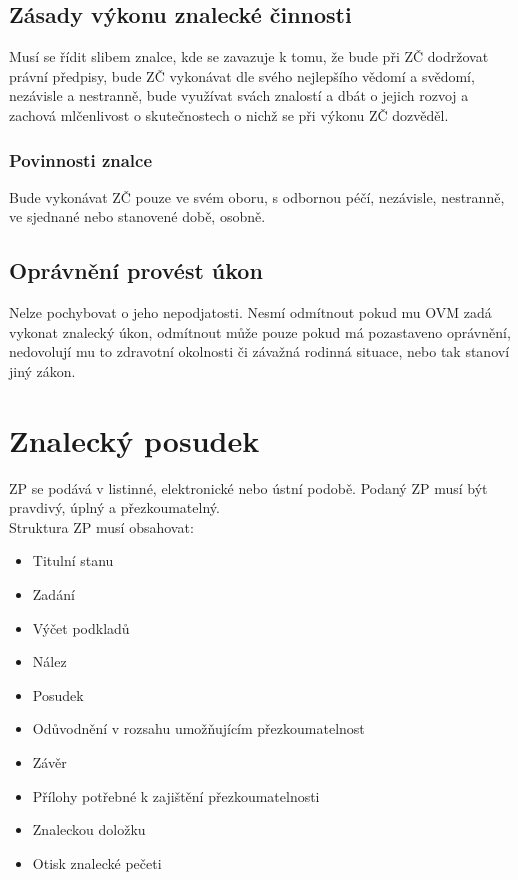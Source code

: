\subsection{Zásady výkonu znalecké činnosti}
Musí se řídit slibem znalce, kde se zavazuje k tomu, že bude při ZČ dodržovat právní předpisy, bude ZČ vykonávat dle svého nejlepšího vědomí a svědomí,
nezávisle a nestranně, bude využívat svách znalostí a dbát o jejich rozvoj a zachová mlčenlivost o skutečnostech o nichž se při výkonu ZČ dozvěděl.
\subsubsection*{Povinnosti znalce}
Bude vykonávat ZČ pouze ve svém oboru, s odbornou péčí, nezávisle, nestranně, ve sjednané nebo stanovené době, osobně.
\subsection{Oprávnění provést úkon}
Nelze pochybovat o jeho nepodjatosti. Nesmí odmítnout pokud mu OVM zadá vykonat znalecký úkon, odmítnout může pouze pokud má pozastaveno oprávnění,
nedovolují mu to zdravotní okolnosti či závažná rodinná situace, nebo tak stanoví jiný zákon.
\section{Znalecký posudek}
ZP se podává v listinné, elektronické nebo ústní podobě. Podaný ZP musí být pravdivý, úplný a přezkoumatelný.\\
Struktura ZP musí obsahovat:
\begin{itemize}
    \item Titulní stanu
    \item Zadání
    \item Výčet podkladů
    \item Nález
    \item Posudek
    \item Odůvodnění v rozsahu umožňujícím přezkoumatelnost
    \item Závěr
    \item Přílohy potřebné k zajištění přezkoumatelnosti
    \item Znaleckou doložku
    \item Otisk znalecké pečeti
\end{itemize}
